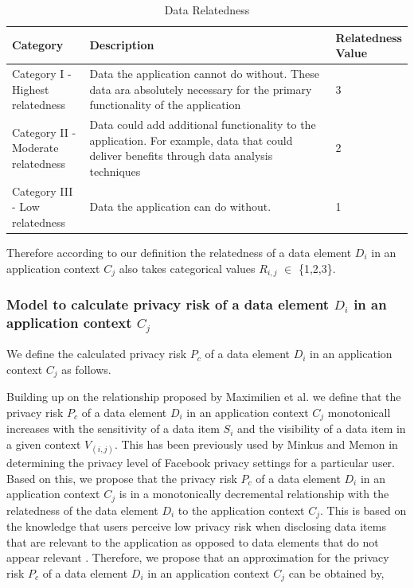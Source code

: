 \documentclass[conference]{IEEEtran}
\begin{document}
\begin{center}
\begin{table}[htbp]
\caption{Data Relatedness}
\begin{center}
\begin{adjustbox}{width=0.5\textwidth} 
\begin{tabular}{|p{0.2\linewidth}|p{0.7\linewidth}|p{0.1\linewidth}|} 
\hline
Category & Description & Relatedness Value \\
\hline
Category I - Highest relatedness & Data the application cannot do without. These data ara absolutely necessary for the primary functionality of the application & 3 \\
\hline
Category II - Moderate relatedness & Data could add additional functionality to the application. For example, data that could deliver benefits through data analysis techniques & 2 \\
\hline
Category III - Low relatedness & Data the application can do without. & 1 \\
\hline
\end{tabular}
\end{adjustbox}
\end{center}
\end{table}
\end{center} 
Therefore according to our definition the relatedness of a data element \textit {$D_i$} in an application context \textit {$C_j$} also takes categorical values \textit {$R_{i,j}$} $\in$ \{1,2,3\}.

\subsubsection {Model to calculate privacy risk of a data element \textit {$D_i$} in an application context \textit {$C_j$} }

We define the calculated privacy risk \textit{$P_c$} of a data element \textit {$D_i$} in an application context \textit {$C_j$} as follows.

Building up on the relationship proposed by Maximilien et al. \cite {maximilien2009privacy} we define that the privacy risk \textit{$P_c$} of a data element \textit {$D_i$} in an application context \textit {$C_j$}  monotonicall increases with the sensitivity of a data item \textit{$S_i$} and the visibility of a data item in a given context \textit{$V_{(i,j)}$}. This has been previously used by Minkus and Memon \cite{minkus2014scale} in determining the privacy level of Facebook privacy settings for a particular user. Based on this, we propose that the privacy risk \textit{$P_c$} of a data element \textit {$D_i$} in an application context \textit {$C_j$} is in a monotonically decremental relationship with the relatedness of the data element \textit {$D_i$} to the application context \textit {$C_j$}. This is based on the knowledge that users perceive low privacy risk when disclosing data items that are relevant to the application as opposed to data elements that do not appear relevant \cite {knijnenburg2013helping}. Therefore, we propose that an approximation for the privacy risk \textit{$P_c$} of a data element \textit {$D_i$} in an application context \textit {$C_j$} can be obtained by,
\end{document}
